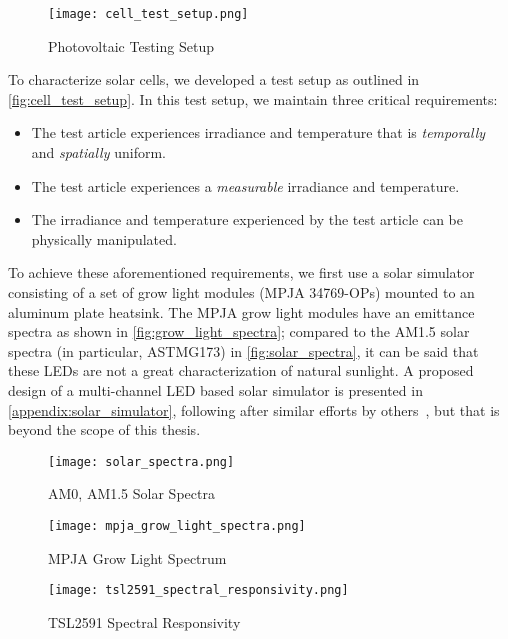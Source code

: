 \begin{figure}[!htbp]
    \texttt{[image: cell\_test\_setup.png]}
    \caption{Photovoltaic Testing Setup}
    \label{fig:cell_test_setup}
\end{figure}

To characterize solar cells, we developed a test setup as outlined in
\autoref{fig:cell_test_setup}. In this test setup, we maintain three critical
requirements:

\begin{itemize}
    \item The test article experiences irradiance and temperature that is
    \textit{temporally} and \textit{spatially} uniform.
    \item The test article experiences a \textit{measurable} irradiance and
    temperature.
    \item The irradiance and temperature experienced by the test article can be
    physically manipulated.
\end{itemize}

To achieve these aforementioned requirements, we first use a solar simulator
consisting of a set of grow light modules (MPJA 34769-OPs) mounted to an
aluminum plate heatsink. The MPJA grow light modules have an emittance
spectra as shown in \autoref{fig:grow_light_spectra}; compared to the AM1.5
solar spectra (in particular, ASTMG173) in \autoref{fig:solar_spectra}, it can
be said that these LEDs are not a great characterization of natural sunlight.
A proposed design of a multi-channel LED based solar simulator is presented in
\autoref{appendix:solar_simulator}, following after similar efforts by
others~\cites{lopez_fraguas_et_al,plyta_et_al,al_ahmad_et_al,naskari_et_al},
but that is beyond the scope of this thesis.

\begin{figure}[!htbp]
    \centering
    \texttt{[image: solar\_spectra.png]}
    \caption{AM0, AM1.5 Solar Spectra}
    \label{fig:solar_spectra}
\end{figure}

\begin{figure}[!htbp]
    \centering
    \texttt{[image: mpja\_grow\_light\_spectra.png]}
    \caption{MPJA Grow Light Spectrum}
    \label{fig:grow_light_spectra}
\end{figure}

\begin{figure}[!htbp]
    \centering
    \texttt{[image: tsl2591\_spectral\_responsivity.png]}
    \caption{TSL2591 Spectral Responsivity}
    \label{fig:tsl2591_spectral_responsivity}
\end{figure}

